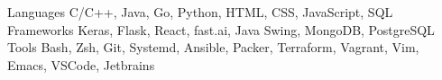 
\begin{cvskills}
  \cvskill
    {Languages}
    {C/C++, Java, Go, Python, HTML, CSS, JavaScript, SQL}
  \cvskill
    {Frameworks}
    {Keras, Flask, React, fast.ai, Java Swing, MongoDB, PostgreSQL}
  \cvskill
    {Tools}
    {Bash, Zsh, Git, Systemd, Ansible, Packer, Terraform, Vagrant, Vim, Emacs, VSCode, Jetbrains}
\end{cvskills}
